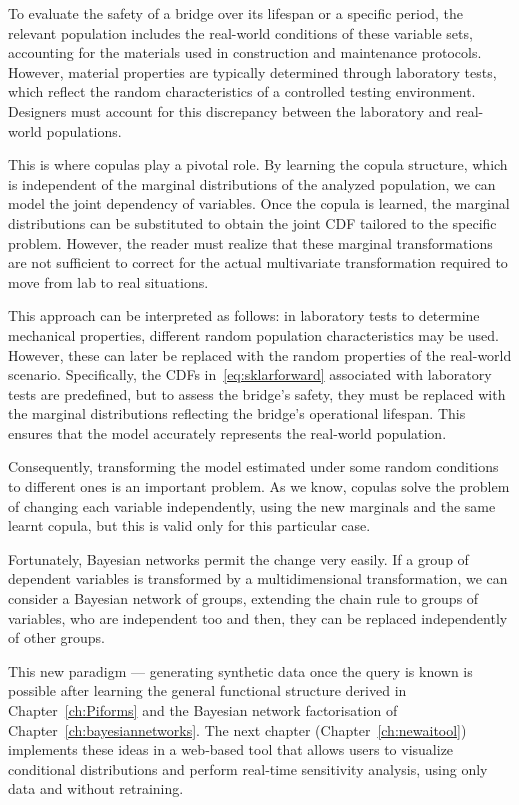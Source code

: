 To evaluate the safety of a bridge over its lifespan or a specific period, the relevant population includes the real-world conditions of these variable sets, accounting for the materials used in construction and maintenance protocols. However, material properties are typically determined through laboratory tests, which reflect the random characteristics of a controlled testing environment. Designers must account for this discrepancy between the laboratory and real-world populations.

This is where copulas play a pivotal role. By learning the copula structure, which is independent of the marginal distributions of the analyzed population, we can model the joint dependency of variables. Once the copula is learned, the marginal distributions can be substituted to obtain the joint CDF tailored to the specific problem. However, the reader must realize that these marginal transformations are not sufficient to correct for the actual multivariate transformation required to move from lab to real situations.

This approach can be interpreted as follows: in laboratory tests to determine mechanical properties, different random population characteristics may be used. However, these can later be replaced with the random properties of the real-world scenario. Specifically, the CDFs in~\eqref{eq:sklarforward} associated with laboratory tests are predefined, but to assess the bridge's safety, they must be replaced with the marginal distributions reflecting the bridge's operational lifespan. This ensures that the model accurately represents the real-world population.

Consequently, transforming the model estimated under some random conditions to different ones is an important problem. As we know, copulas solve the problem of changing each variable independently, using the new marginals and the same learnt copula, but this is valid only for this particular case.

Fortunately, Bayesian networks permit the change very easily. If a group of dependent variables is transformed by a multidimensional transformation, we can consider a Bayesian network of groups, extending the chain rule to groups of variables, who are independent too and then, they can be replaced independently of other groups.

This new paradigm — generating synthetic data once the query is known is possible after learning the general functional structure derived in Chapter~\ref{ch:Piforms} and the Bayesian network factorisation of Chapter~\ref{ch:bayesiannetworks}. The next chapter (Chapter~\ref{ch:newaitool}) implements these ideas in a web‑based tool that allows users to visualize conditional distributions and perform real‑time sensitivity analysis, using only data and without retraining. 